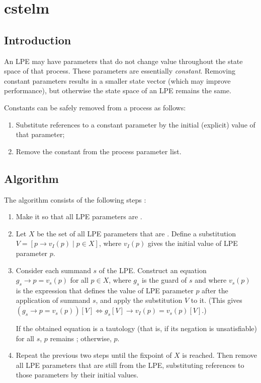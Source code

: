 \chapter{cstelm}

\section{Introduction}

An LPE may have parameters that do not change value throughout the state space of that process.
These parameters are essentially \emph{constant}.
Removing constant parameters results in a smaller state vector (which may improve performance), but otherwise the state space of an LPE remains the same.

Constants can be safely removed from a process as follows:
\begin{enumerate}
\item Substitute references to a constant parameter by the initial (explicit) value of that parameter;
\item Remove the constant from the process parameter list.
\end{enumerate}

\section{Algorithm}

The algorithm consists of the following steps \cite{groote2001computer}:

\begin{enumerate}

\item Make it so that all LPE parameters are .

\item Let $X$ be the set of all LPE parameters that are .
Define a substitution $V = [p \rightarrow v_I(p) \;|\; p \in X]$, where $v_I(p)$ gives the initial value of LPE parameter $p$.

\item Consider each summand $s$ of the LPE.
Construct an equation $g_s \rightarrow p = v_s(p)$ for all $p \in X$, where $g_s$ is the guard of $s$ and where $v_s(p)$ is the expression that defines the value of LPE parameter $p$ after the application of summand $s$, and apply the substitution $V$ to it.
(This gives $(g_s \rightarrow p = v_s(p))[V] \Leftrightarrow {g_s}[V] \rightarrow v_I(p) = v_s(p)[V]$.)

If the obtained equation is a tautology (that is, if its negation is unsatisfiable) for all $s$, $p$ remains ; otherwise,  $p$.

\item Repeat the previous two steps until the fixpoint of $X$ is reached.
Then remove all LPE parameters that are still  from the LPE, substituting references to those parameters by their initial values.

\end{enumerate}

